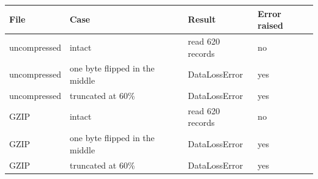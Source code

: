 \begin{tabular}{llll}
\toprule
File & Case & Result & Error raised \\
\midrule
uncompressed & intact & read 620 records & no \\
uncompressed & one byte flipped in the middle & DataLossError & yes \\
uncompressed & truncated at 60\% & DataLossError & yes \\
GZIP & intact & read 620 records & no \\
GZIP & one byte flipped in the middle & DataLossError & yes \\
GZIP & truncated at 60\% & DataLossError & yes \\
\bottomrule
\end{tabular}
